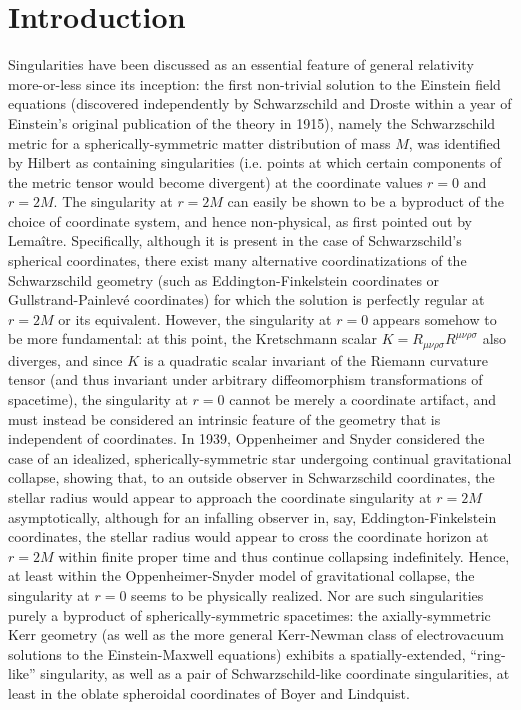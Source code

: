 \documentclass{article}
\begin{document}
\section{Introduction}

Singularities have been discussed as an essential feature of general relativity more-or-less since its inception: the first non-trivial solution to the Einstein field equations (discovered independently by Schwarzschild\cite{schwarzschild} and Droste\cite{droste} within a year of Einstein's original publication of the theory in 1915), namely the Schwarzschild metric for a spherically-symmetric matter distribution of mass $M$, was identified by Hilbert\cite{hilbert} as containing singularities (i.e. points at which certain components of the metric tensor would become divergent) at the coordinate values ${r = 0}$ and ${r = 2M}$. The singularity at ${r = 2M}$ can easily be shown to be a byproduct of the choice of coordinate system, and hence non-physical, as first pointed out by Lema\^itre\cite{lemaitre}. Specifically, although it is present in the case of Schwarzschild's spherical coordinates, there exist many alternative coordinatizations of the Schwarzschild geometry (such as Eddington-Finkelstein coordinates or Gullstrand-Painlev\'e coordinates) for which the solution is perfectly regular at ${r = 2M}$ or its equivalent. However, the singularity at ${r = 0}$ appears somehow to be more fundamental: at this point, the Kretschmann scalar ${K = R_{\mu \nu \rho \sigma} R^{\mu \nu \rho \sigma}}$ also diverges, and since $K$ is a quadratic scalar invariant of the Riemann curvature tensor (and thus invariant under arbitrary diffeomorphism transformations of spacetime), the singularity at ${r = 0}$ cannot be merely a coordinate artifact, and must instead be considered an intrinsic feature of the geometry that is independent of coordinates. In 1939, Oppenheimer and Snyder\cite{oppenheimer} considered the case of an idealized, spherically-symmetric star undergoing continual gravitational collapse, showing that, to an outside observer in Schwarzschild coordinates, the stellar radius would appear to approach the coordinate singularity at ${r = 2M}$ asymptotically, although for an infalling observer in, say, Eddington-Finkelstein coordinates, the stellar radius would appear to cross the coordinate horizon at ${r = 2M}$ within finite proper time and thus continue collapsing indefinitely. Hence, at least within the Oppenheimer-Snyder model of gravitational collapse, the singularity at ${r = 0}$ seems to be physically realized. Nor are such singularities purely a byproduct of spherically-symmetric spacetimes: the axially-symmetric Kerr geometry (as well as the more general Kerr-Newman class of electrovacuum solutions to the Einstein-Maxwell equations) exhibits a spatially-extended, ``ring-like'' singularity, as well as a pair of Schwarzschild-like coordinate singularities, at least in the oblate spheroidal coordinates of Boyer and Lindquist\cite{boyer}.
\end{document}
